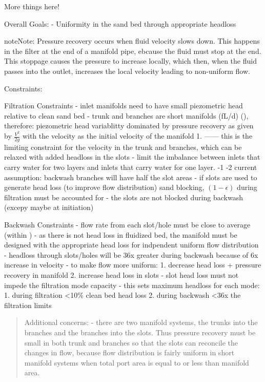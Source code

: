 \documentclass[letterpaper,10pt,english]{sphinxmanual}
\begin{document}
More things here!

Overall Goals:
- Uniformity in the sand bed through appropriate headloss

\begin{sphinxadmonition}{note}{Note:}
Pressure recovery occurs when fluid velocity slows down. This happens in the filter at the end of a manifold pipe, ebcause the fluid must stop at the end. This stoppage causes the pressure to increase locally, which then, when the fluid passes into the outlet, increases the local velocity leading to non-uniform flow.
\end{sphinxadmonition}

Constraints:

Filtration Constraints
- inlet manifolds need to have small piezometric head relative to clean sand bed
- trunk and branches are short manifolds (fL/d) (), therefore: piezometric head variablitty dominated by pressure recovery as given by \(\frac{V^2}{2g}\) with the velocity as the initial velocity of the manifold 1. —— this is the limiting constraint for the velocity in the trunk and branches, which can be relaxed with added headloss in the slots
- limit the imbalance between inlets that carry water for two layers and inlets that carry water for one layer. -1  -2 current assumption: backwash branches will have half the slot areas
- if slots are used to generate head loss (to improve flow distribution) sand blocking, \((1-\epsilon)\) during filtration must be accounted for
- the slots are not blocked during backwash (excepy maybe at initiation)

Backwash Constraints
- flow rate from each slot/hole must be close to average (within )
- as there is not head loss in fluidized bed, the manifold must be designed with the appropriate head loss for indpendent uniform flow distribution
- headloss through slots/holes will be 36x greater during backwash because of 6x increase in velocity
- to make flow more uniform: 1. decrease head loss + pressure recovery in manifold 2.  increase head loss in slots
- slot head loss must not impede the filtration mode capacity
- this sets maximum headloss for each mode: 1. during filtration \textless{}10\% clean bed head loss 2. during backwash \textless{}36x the filtration limits
\begin{quote}

Additional concerns:
- there are two manifold systems, the trunks into the branches and the branches into the slots. Thus pressure recovery must be small in both trunk and branches so that the slots can reconcile the changes in flow, because flow distribution is fairly uniform in short manifold systems when total port area is equal to or less than manifold area.
\end{quote}
\end{document}
